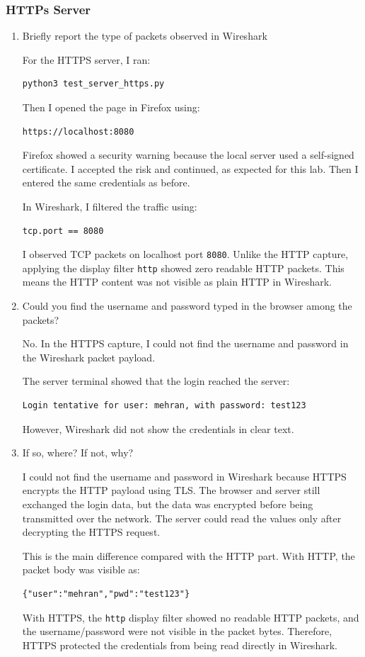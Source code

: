 \documentclass{article}
\begin{document}
\subsubsection{HTTPs Server}

\begin{enumerate}
    \item Briefly report the type of packets observed in Wireshark

    For the HTTPS server, I ran:
    \begin{verbatim}
python3 test_server_https.py
    \end{verbatim}

    Then I opened the page in Firefox using:
    \begin{verbatim}
https://localhost:8080
    \end{verbatim}

    Firefox showed a security warning because the local server used a self-signed certificate. I accepted the risk and continued, as expected for this lab. Then I entered the same credentials as before.

    In Wireshark, I filtered the traffic using:
    \begin{verbatim}
tcp.port == 8080
    \end{verbatim}

    I observed TCP packets on localhost port \texttt{8080}. Unlike the HTTP capture, applying the display filter \texttt{http} showed zero readable HTTP packets. This means the HTTP content was not visible as plain HTTP in Wireshark.

    \item Could you find the username and password typed in the browser among the packets?

    No. In the HTTPS capture, I could not find the username and password in the Wireshark packet payload.

    The server terminal showed that the login reached the server:
    \begin{verbatim}
Login tentative for user: mehran, with password: test123
    \end{verbatim}

    However, Wireshark did not show the credentials in clear text.

    \item If so, where? If not, why?

    I could not find the username and password in Wireshark because HTTPS encrypts the HTTP payload using TLS. The browser and server still exchanged the login data, but the data was encrypted before being transmitted over the network. The server could read the values only after decrypting the HTTPS request.

    This is the main difference compared with the HTTP part. With HTTP, the packet body was visible as:
    \begin{verbatim}
{"user":"mehran","pwd":"test123"}
    \end{verbatim}

    With HTTPS, the \texttt{http} display filter showed no readable HTTP packets, and the username/password were not visible in the packet bytes. Therefore, HTTPS protected the credentials from being read directly in Wireshark.
\end{enumerate}
\end{document}

